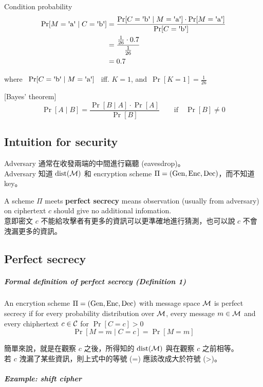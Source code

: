 Condition probability
\begin{align*}
	\Pr[M = \letter{a} \mid C =  \letter{b}] &=
	\frac{\Pr[C = \letter{b} \mid M = \letter{a}] \cdot \Pr[M = \letter{a}]}{\Pr[C = \letter{b}]} \\
	&= \frac{\frac{1}{26} \cdot 0.7}{\frac{1}{26}} \\
	&= 0.7
\end{align*}

where \, \(\Pr[C = \letter{b} \mid M = \letter{a}]\) \, iff. \(K = 1\), and\, \(\Pr[K = 1] = \displaystyle\frac{1}{26}\)

[Bayes' theorem]
\[\Pr[A \mid B] = \frac{\Pr[B \mid A] \cdot \Pr[A]}{\Pr[B]} \qquad \text{if} \quad \Pr[B] \neq 0\]


\subsection{Intuition for security}

Adversary 通常在收發兩端的中間進行竊聽 (eavesdrop)。 \\
Adversary 知道 \(\operatorname{dist}(\operatorname{\mathcal{M}})\) 和 encryption scheme \(\Pi = (\operatorname{Gen}, \operatorname{Enc}, \operatorname{Dec})\)，而不知道 key。

A scheme \(\Pi\) meets \textbf{perfect secrecy} means observation (usually from adversary) on ciphertext \(c\) should give no additional infomation. \\
意即密文 \(c\) 不能給攻擊者有更多的資訊可以更準確地進行猜測，也可以說 \(c\) 不會洩漏更多的資訊。


\subsection{Perfect secrecy}

\subparagraph{Formal definition of perfect secrecy (\textbf{Definition 1})}

An encrytion scheme \(\Pi = (\operatorname{Gen}, \operatorname{Enc}, \operatorname{Dec})\) with message space \(\operatorname{\mathcal{M}}\) is perfect secrecy if for every probability distribution over \(\operatorname{\mathcal{M}}\), every message \(m \in \operatorname{\mathcal{M}}\) and every chiphertext \(c \in \operatorname{\mathcal{C}}\) for \(\Pr[C = c] > 0\)
\[\Pr[M = m \mid C = c] = \Pr[M = m]\]

簡單來說，就是在觀察 \(c\) 之後，所得知的 \(\operatorname{dist}(\operatorname{\mathcal{M}})\) 與在觀察 \(c\) 之前相等。 \\
若 \(c\) 洩漏了某些資訊，則上式中的等號 (=) 應該改成大於符號 (>)。


\subparagraph{Example: shift cipher}

